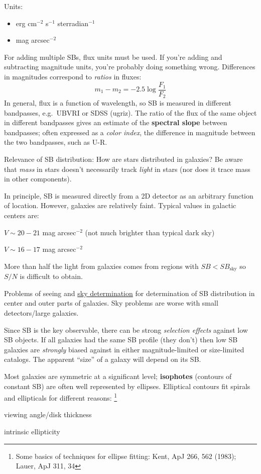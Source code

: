\documentclass{article}
\begin{document}
Units:
\begin{itemize}
    \item erg cm$^{-2}$ s$^{-1}$ sterradian$^{-1}$
    \item mag arcsec$^{-2}$
\end{itemize}
For adding multiple SBs, flux units must be used.
If you're adding and subtracting magnitude units, you're probably
doing something wrong. \Smiley
Differences in magnitudes correspond to \emph{ratios} in fluxes:
\[
    m_{1} - m_{2} = -2.5\log\frac{F_{1}}{F_{2}}
\]
In general, flux is a function of wavelength, so SB is measured in
different bandpasses, e.g.\ UBVRI or SDSS (ugriz).
The ratio of the flux of the same object in different bandpasses
gives an estimate of the \textbf{spectral slope} between bandpasses;
often expressed as a \emph{color index}, the difference in magnitude
between the two bandpasses, such as U-R.

Relevance of SB distribution:
\textcolor{bred}{How are stars distributed in galaxies?}
Be aware that \emph{mass} in stars doesn't necessarily track
\emph{light} in stars (nor does it trace mass in other components).

In principle, SB is measured directly from a 2D detector as an
arbitrary function of location. However,
galaxies are relatively faint. Typical values in galactic centers are:
\begin{description}[align=right,labelwidth=5em]
    \item [Spiral] $V \sim 20 - 21$ mag arcsec$^{-2}$
        (not much brighter than typical dark sky)
    \item [Elliptical] $V \sim 16 - 17$ mag arcsec$^{-2}$
\end{description}
More than half the light from galaxies comes from regions with
$SB < SB_{\mathrm{sky}}$ so $S/N$ is difficult to obtain.

Problems of seeing and \href{http://astronomy.nmsu.edu/holtz/a555/html/diagrams/a616/sky.htm}
{sky determination} for determination of SB distribution in center and
outer parts of galaxies. Sky problems are worse with small detectors/large
galaxies.

Since SB is the key observable, there can be strong \emph{selection effects}
against low SB objects. If all galaxies had the same SB profile (they don't)
then low SB galaxies are \emph{strongly} biased against in either
magnitude-limited or size-limited catalogs.
The apparent ``size'' of a galaxy will depend on its SB.

Most galaxies are symmetric at a significant level;
\textbf{isophotes} (contours of constant SB) are often well represented by ellipses.
Elliptical contours fit spirals and ellipticals for different reasons:
\footnote{Some basics of techniques for ellipse fitting:
Kent, ApJ 266, 562 (1983); Lauer, ApJ 311, 34}
\begin{description}[align=right, labelwidth=5em]
    \item [Spiral] viewing angle/disk thickness
    \item [Elliptical] intrinsic ellipticity
\end{description}
\end{document}
